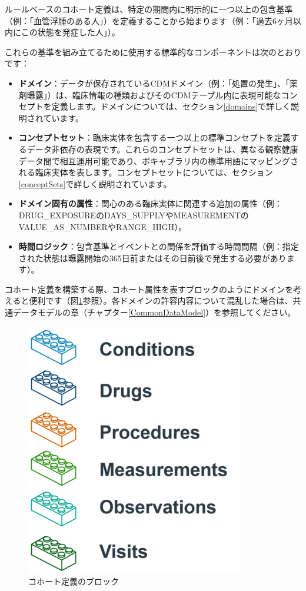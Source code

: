 \documentclass[
  11pt]{book}
\theoremstyle{definition}
\theoremstyle{definition}
\theoremstyle{definition}
\theoremstyle{definition}
\theoremstyle{remark}
\begin{document}
ルールベースのコホート定義は、特定の期間内に明示的に一つ以上の包含基準（例：「血管浮腫のある人」）を定義することから始まります（例：「過去6ヶ月以内にこの状態を発症した人」）。

これらの基準を組み立てるために使用する標準的なコンポーネントは次のとおりです：

\begin{itemize}
\item
  \textbf{ドメイン}：データが保存されているCDMドメイン（例：「処置の発生」、「薬剤曝露」）は、臨床情報の種類およびそのCDMテーブル内に表現可能なコンセプトを定義します。ドメインについては、セクション\ref{domains}で詳しく説明されています。
\item
  \textbf{コンセプトセット}：臨床実体を包含する一つ以上の標準コンセプトを定義するデータ非依存の表現です。これらのコンセプトセットは、異なる観察健康データ間で相互運用可能であり、ボキャブラリ内の標準用語にマッピングされる臨床実体を表します。コンセプトセットについては、セクション\ref{conceptSets}で詳しく説明されています。
\item
  \textbf{ドメイン固有の属性}：関心のある臨床実体に関連する追加の属性（例：DRUG\_EXPOSUREのDAYS\_SUPPLYやMEASUREMENTのVALUE\_AS\_NUMBERやRANGE\_HIGH）。
\item
  \textbf{時間ロジック}：包含基準とイベントとの関係を評価する時間間隔（例：指定された状態は曝露開始の365日前またはその日前後で発生する必要があります）。
\end{itemize}

コホート定義を構築する際、コホート属性を表すブロックのようにドメインを考えると便利です（図\ref{fig:cohortLegos}参照）。各ドメインの許容内容について混乱した場合は、共通データモデルの章（チャプター\ref{CommonDataModel}）を参照してください。

\begin{figure}

{\centering \includegraphics[width=0.5\linewidth]{images/Cohorts/cohort-legos} 

}

\caption{コホート定義のブロック}\label{fig:cohortLegos}
\end{figure}
\end{document}
